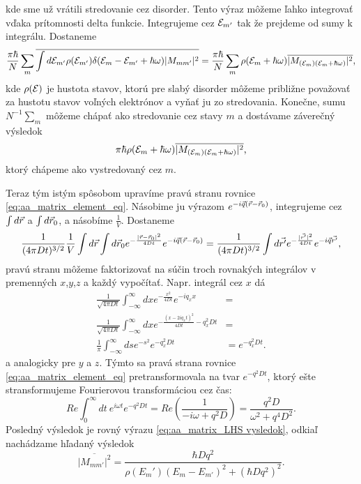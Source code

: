 kde sme už vrátili stredovanie cez disorder. Tento výraz môžeme ľahko integrovať vďaka prítomnosti delta funkcie. Integrujeme cez $\mathcal{E}_{m'}$ tak že prejdeme od sumy k integrálu. Dostaneme
\begin{equation}
 \frac{\pi \hbar}{N}\sum_m  \overline{\int d\mathcal{E}_{m'} \rho(\mathcal{E}_{m'}) \delta(\mathcal{E}_m-\mathcal{E}_{m'}+\hbar \omega) |M_{mm'}|^2} =\frac{\pi \hbar}{N}\sum_m \rho(\mathcal{E}_{m}+\hbar\omega)\overline{|M_{(\mathcal{E}_m)(\mathcal{E}_m+\hbar\omega)}|^2} \text{,}
\end{equation}
kde $\rho(\mathcal{E})$ je hustota stavov, ktorú pre slabý disorder môžeme približne považovať za hustotu stavov voľných elektrónov a vyňať ju zo stredovania. Konečne, sumu $N^{-1}\sum_m$ môžeme chápať ako stredovanie cez stavy $m$ a
dostávame záverečný výsledok
\begin{equation}
 \label{eq:aa_matrix_LHS vysledok}
\pi \hbar \rho(\mathcal{E}_{m}+\hbar\omega)  \overline{|M_{(\mathcal{E}_m)(\mathcal{E}_m+\hbar\omega)}|^2} \text{,}
\end{equation}
ktorý chápeme ako vystredovaný cez $m$.


Teraz tým istým spôsobom upravíme pravú stranu rovnice \eqref{eq:aa_matrix_element_eq}. Násobime ju výrazom $e^{-i\vec{q}(\vec{r}-\vec{r}_0)}$, integrujeme cez $\int d\vec{r}$ a $\int d\vec{r}_0$, a násobíme $\frac{1}{V}$. Dostaneme
\begin{equation}
\label{eq:aa_matrix_RHS begin}
 \frac{1}{(4\pi Dt)^{3/2}}\frac{1}{V} \int d\vec{r} \int d\vec{r}_0 e^{-\frac{|\vec{r}-\vec{r}_0|^2}{4Dt}}e^{-i\vec{q}(\vec{r}-\vec{r}_0)} =
 \frac{1}{(4\pi Dt)^{3/2}}\int d\vec{r'} e^{-\frac{|\vec{r'}|^2}{4Dt}}e^{-i\vec{q} \vec{r'}} \text{,}
\end{equation}
pravú stranu môžeme faktorizovať na súčin troch rovnakých integrálov v premenných $x$,$y$,$z$ a každý vypočítať. Napr. integrál cez $x$ dá
\begin{align*}
  \frac{1}{\sqrt{4\pi Dt}}\int_{-\infty}^{\infty} dx e^{-\frac{x^2}{4Dt}}e^{-iq_x x} &=\\
  \frac{1}{\sqrt{4\pi Dt}}\int_{-\infty}^{\infty} dx e^{-\frac{(x-2iq_xt)^2}{4Dt}-q_x^2Dt}&=\\
  \frac{1}{\pi}\int_{-\infty}^{\infty} ds e^{-s^2} e^{-q_x^2Dt}&= e^{-q_x^2Dt}\text{.}
\end{align*}
a analogicky pre $y$ a $z$.  Týmto sa pravá strana rovnice \eqref{eq:aa_matrix_element_eq} pretransformovala na tvar $e^{-q^2Dt}$,
ktorý ešte stransformujeme Fourierovou transformáciou cez čas:
\begin{equation}
\label{eq:aa_matrix_RHS}
 Re{\int_0^{\infty}dt\ e^{i\omega t}e^{-q^2Dt}}=Re(\frac{1}{-i\omega+q^2D})=\frac{q^2D}{\omega^2+q^4D^2}\text{.}
\end{equation}
Posledný výsledok je rovný výrazu \eqref{eq:aa_matrix_LHS vysledok}, odkiaľ nachádzame hľadaný výsledok
\begin{equation}
 \label{eq:aa_matrix_element_final}
 \overline{|M_{mm'}|^2}=\frac{\hbar D q^2}{\rho(E_m')(E_m-E_{m'})^2+(\hbar Dq^2)^2}\text{.}
\end{equation}

